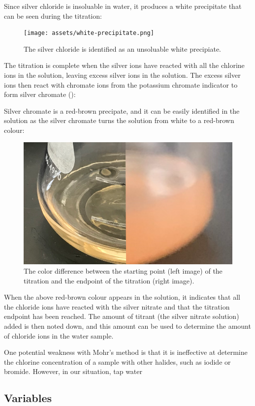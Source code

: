 \documentclass[11pt]{article}
\begin{document}
\centerline{}

Since silver chloride is insoluable in water, it produces a white precipitate that can be seen during the titration:

\begin{figure}[H]
	\centering
	\texttt{[image: assets/white-precipitate.png]}
	\caption{The silver chloride is identified as an unsoluable white precipiate.}
\end{figure}

The titration is complete when the silver ions have reacted with all the chlorine ions in the solution, leaving excess silver ions in the solution. The excess silver ions then react with chromate ions from the potassium chromate indicator to form silver chromate ():

\centerline{}

Silver chromate is a red-brown precipate, and it can be easily identified in the solution as the silver chromate turns the solution from white to a red-brown colour:

\begin{figure}[H]
	\centering
	\includegraphics[width=0.3\linewidth]{assets/color-difference}
	\caption{The color difference between the starting point (left image) of the titration and the endpoint of the titration (right image).}
\end{figure}

When the above red-brown colour appears in the solution, it indicates that all the chloride ions have reacted with the silver nitrate and that the titration endpoint has been reached. The amount of titrant (the silver nitrate solution) added is then noted down, and this amount can be used to determine the amount of chloride ions in the water sample.

One potential weakness with Mohr's method is that it is ineffective at determine the chlorine concentration of a sample with other halides, such as iodide or bromide. However, in our situation, tap water %

\subsection{Variables}
\end{document}
